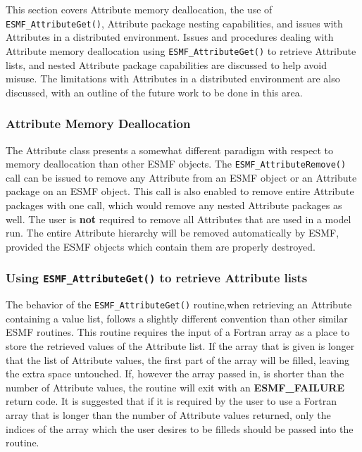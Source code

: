 %

This section covers Attribute memory deallocation, the use of {\tt ESMF\_AttributeGet()}, Attribute package nesting capabilities, and issues with Attributes in a distributed environment.  Issues and procedures dealing with Attribute memory deallocation using {\tt ESMF\_AttributeGet()} to retrieve Attribute lists, and nested Attribute package capabilities are discussed to help avoid misuse.  The limitations with Attributes in a distributed environment are also discussed, with an outline of the future work to be done in this area. 

\subsubsection{Attribute Memory Deallocation}

The Attribute class presents a somewhat different paradigm with respect to memory deallocation than other ESMF objects.  The {\tt ESMF\_AttributeRemove()} call can be issued to remove any Attribute from an ESMF object or an Attribute package on an ESMF object.  This call is also enabled to remove entire Attribute packages with one call, which would remove any nested Attribute packages as well.  The user is {\bf not} required to remove all Attributes that are used in a model run.  The entire Attribute hierarchy will be removed automatically by ESMF, provided the ESMF objects which contain them are properly destroyed.  

\subsubsection{Using {\tt ESMF\_AttributeGet()} to retrieve Attribute lists}

The behavior of the {\tt ESMF\_AttributeGet()} routine,when retrieving an Attribute containing a value list, follows a slightly different convention than other similar ESMF routines.  This routine requires the input of a Fortran array as a place to store the retrieved values of the Attribute list.  If the array that is given is longer that the list of Attribute values, the first part of the array will be filled, leaving the extra space untouched.  If, however the array passed in, is shorter than the number of Attribute values, the routine will exit with an {\bf ESMF\_FAILURE} return code.  It is suggested that if it is required by the user to use a Fortran array that is longer than the number of Attribute values returned, only the indices of the array which the user desires to be filleds should be passed into the routine.  
  
